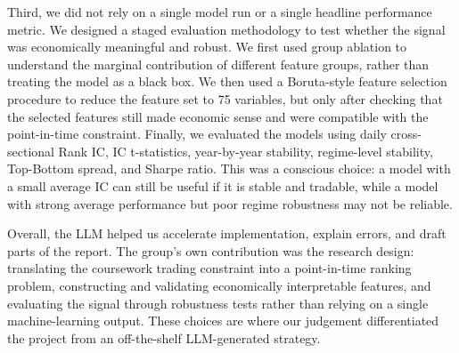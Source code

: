 \documentclass[12pt]{article}
\begin{document}
Third, we did not rely on a single model run or a single headline performance metric. We designed a staged evaluation methodology to test whether the signal was economically meaningful and robust. We first used group ablation to understand the marginal contribution of different feature groups, rather than treating the model as a black box. We then used a Boruta-style feature selection procedure to reduce the feature set to 75 variables, but only after checking that the selected features still made economic sense and were compatible with the point-in-time constraint. Finally, we evaluated the models using daily cross-sectional Rank IC, IC t-statistics, year-by-year stability, regime-level stability, Top-Bottom spread, and Sharpe ratio. This was a conscious choice: a model with a small average IC can still be useful if it is stable and tradable, while a model with strong average performance but poor regime robustness may not be reliable.

Overall, the LLM helped us accelerate implementation, explain errors, and draft parts of the report. The group’s own contribution was the research design: translating the coursework trading constraint into a point-in-time ranking problem, constructing and validating economically interpretable features, and evaluating the signal through robustness tests rather than relying on a single machine-learning output. These choices are where our judgement differentiated the project from an off-the-shelf LLM-generated strategy.
\end{document}
